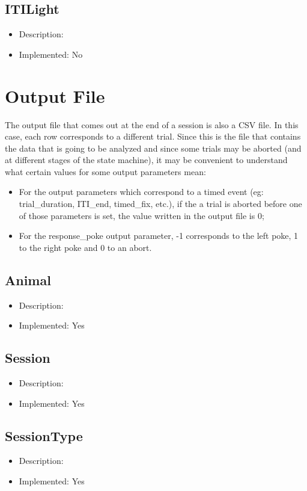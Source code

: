 \subsection*{ITILight}
\begin{itemize}
	\item Description: 
	\item Implemented: No
\end{itemize}

\section{Output File}
\label{sec:output_file}
The output file that comes out at the end of a session is also a CSV file. In this case, each row corresponds to a different trial. Since this is the file that contains the data that is going to be analyzed and since some trials may be aborted (and at different stages of the state machine), it may be convenient to understand what certain values for some output parameters mean:
\begin{itemize}
    \item For the output parameters which correspond to a timed event (eg: trial\_duration, ITI\_end, timed\_fix, etc.), if the a trial is aborted before one of those parameters is set, the value written in the output file is 0;
    \item For the response\_poke output parameter, -1 corresponds to the left poke, 1 to the right poke and 0 to an abort.
\end{itemize}

\subsection*{Animal}
\begin{itemize}
	\item Description: 
	\item Implemented: Yes
\end{itemize}

\subsection*{Session}
\begin{itemize}
	\item Description: 
	\item Implemented: Yes
\end{itemize}

\subsection*{SessionType}
\begin{itemize}
	\item Description: 
	\item Implemented: Yes
\end{itemize}

